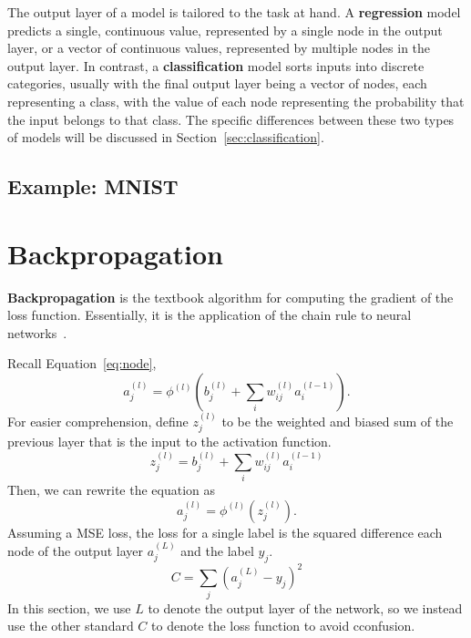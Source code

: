 \documentclass[12pt]{report}
\theoremstyle{definition}
\theoremstyle{remark}
\begin{document}
The output layer of a model is tailored to the task at hand. A \textbf{regression} model predicts a single, continuous value, represented by a single node in the output layer, or a vector of continuous values, represented by multiple nodes in the output layer. In contrast, a \textbf{classification} model sorts inputs into discrete categories, usually with the final output layer being a vector of nodes, each representing a class, with the value of each node representing the probability that the input belongs to that class. The specific differences between these two types of models will be discussed in Section~\ref{sec:classification}.

\subsection{Example: MNIST}

\section{Backpropagation}

\textbf{Backpropagation} is the textbook algorithm for computing the gradient of the loss function. Essentially, it is the application of the chain rule to neural networks~\cite{nielsen_neural_2019,sanderson_backpropagation_2017}.

Recall Equation~\ref{eq:node},
\begin{equation}
    a^{(l)}_j = \phi^{(l)}\left(b_j^{(l)} + \sum_i w_{ij}^{(l)} a_i^{(l-1)}\right).
\end{equation}
For easier comprehension, define $z^{(l)}_j$ to be the weighted and biased sum of the previous layer that is the input to the activation function.
\begin{equation}\label{eq:weighted-sum}
    z^{(l)}_j = b_j^{(l)} + \sum_i w_{ij}^{(l)} a_i^{(l-1)}
\end{equation}
Then, we can rewrite the equation as
\begin{equation}\label{eq:simplified-node}
    a^{(l)}_j = \phi^{(l)}(z_j^{(l)}).
\end{equation}
Assuming a MSE loss, the loss for a single label is the squared difference each node of the output layer $a^{(L)}_j$ and the label $y_j$.
\begin{equation}
    C = \sum_j {(a^{(L)}_j - y_j)}^2
\end{equation}
In this section, we use $L$ to denote the output layer of the network, so we instead use the other standard $C$ to denote the loss function to avoid cconfusion.
\end{document}
